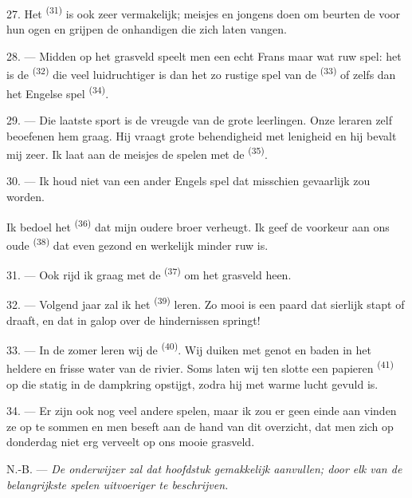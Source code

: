 \VUsaut{5.0mm}
\VUsaut{3.4mm}

27. Het  \textsuperscript{(31)} is ook zeer vermakelijk; meisjes en
jongens doen om beurten de  voor hun ogen en grijpen de onhandigen die zich
laten vangen.

28. --- Midden op het grasveld speelt men een echt Frans maar wat ruw spel: het is de
 \textsuperscript{(32)} die veel luidruchtiger is dan het zo rustige spel van de
 \textsuperscript{(33)} of zelfs dan het Engelse spel 
\textsuperscript{(34)}.

29. --- Die laatste sport is de vreugde van de grote leerlingen. Onze leraren zelf beoefenen
hem graag. Hij vraagt grote behendigheid met lenigheid en hij bevalt mij zeer. Ik laat aan de
meisjes de spelen met de  \textsuperscript{(35)}.

30. --- Ik houd niet van een ander Engels spel dat misschien gevaarlijk zou worden.

Ik bedoel het  \textsuperscript{(36)} dat mijn oudere broer verheugt. Ik geef
de voorkeur aan ons oude  \textsuperscript{(38)} dat even gezond en
werkelijk minder ruw is.

\VUsaut{4.6mm}
\VUsaut{3.0mm}

31. --- Ook rijd ik graag met de  \textsuperscript{(37)} om het grasveld heen.

32. --- Volgend jaar zal ik het  \textsuperscript{(39)} leren. Zo mooi is
een paard dat sierlijk stapt of draaft, en dat in galop over de hindernissen springt!

33. --- In de zomer leren wij de  \textsuperscript{(40)}. Wij duiken met
genot en baden in het heldere en frisse water van de rivier. Soms laten wij ten slotte een
papieren  \textsuperscript{(41)} op die statig in de dampkring opstijgt, zodra
hij met warme lucht gevuld is.

34. --- Er zijn ook nog veel andere spelen, maar ik zou er geen einde aan vinden ze op te
sommen en men beseft aan de hand van dit overzicht, dat men zich op donderdag niet erg
verveelt op ons mooie grasveld.

N.-B. --- \textit{De onderwijzer zal dat hoofdstuk gemakkelijk aanvullen; door elk van de
belangrijkste spelen uitvoeriger te beschrijven.}
\VUsaut{6.0mm}
\VUfilet{22mm}
